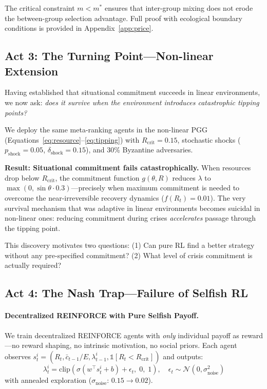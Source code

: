 \documentclass{article}
\begin{document}
\noindent The critical constraint $m < m^*$ ensures that inter-group mixing does not erode the between-group selection advantage.
Full proof with ecological boundary conditions is provided in Appendix~\ref{app:price}.

\subsection{Act 3: The Turning Point---Non-linear Extension}
\label{sec:turning_point}

Having established that situational commitment succeeds in linear environments, we now ask: \emph{does it survive when the environment introduces catastrophic tipping points?}

We deploy the same meta-ranking agents in the non-linear PGG (Equations~\ref{eq:resource}--\ref{eq:tipping}) with $R_{\text{crit}} = 0.15$, stochastic shocks ($p_{\text{shock}} = 0.05$, $\delta_{\text{shock}} = 0.15$), and 30\% Byzantine adversaries.

\textbf{Result: Situational commitment fails catastrophically.}
When resources drop below $R_{\text{crit}}$, the commitment function $g(\theta, R)$ reduces $\lambda$ to $\max(0, \sin\theta \cdot 0.3)$---precisely when maximum commitment is needed to overcome the near-irreversible recovery dynamics ($f(R_t) = 0.01$).
The very survival mechanism that was adaptive in linear environments becomes suicidal in non-linear ones: reducing commitment during crises \emph{accelerates} passage through the tipping point.

This discovery motivates two questions: (1) Can pure RL find a better strategy without any pre-specified commitment? (2) What level of crisis commitment is actually required?

\subsection{Act 4: The Nash Trap---Failure of Selfish RL}
\label{sec:nash_trap}

\paragraph{Decentralized REINFORCE with Pure Selfish Payoff.}
We train decentralized REINFORCE agents with \emph{only} individual payoff as reward---no reward shaping, no intrinsic motivation, no social priors.
Each agent observes $s_t^i = (R_t, \bar{c}_{t-1}/E, \lambda_{t-1}^i, \mathbb{1}[R_t < R_{\text{crit}}])$ and outputs:
\begin{equation}
\lambda_t^i = \text{clip}\!\left(\sigma(w^\top s_t^i + b) + \epsilon_t,\; 0,\; 1\right), \quad \epsilon_t \sim \mathcal{N}(0, \sigma_{\text{noise}}^2)
\end{equation}
with annealed exploration ($\sigma_{\text{noise}}$: $0.15 \to 0.02$).
\end{document}
